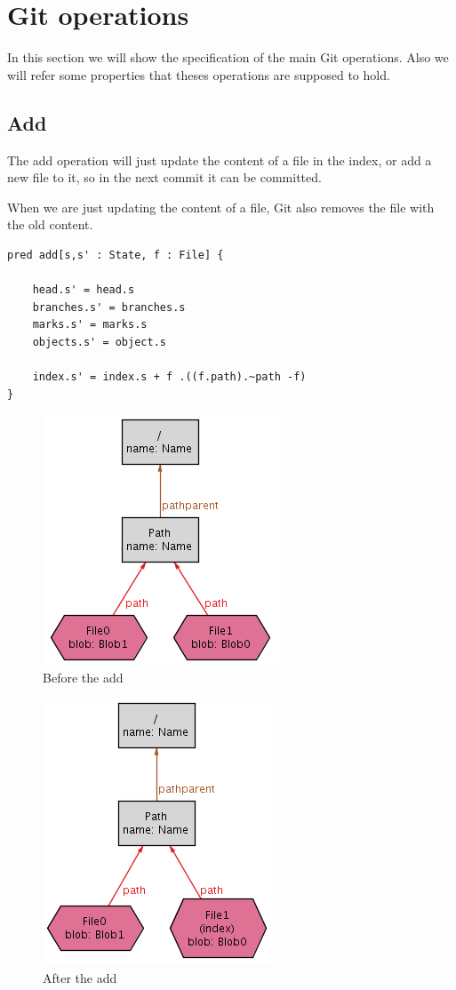 \section{Git operations}

In this section we will show the specification of the main Git operations.
Also we will refer some properties 
that theses operations are supposed to hold. \par

\subsection{Add}

The add operation will just update the content of a file in the index, 
or add a new file to it, so in the next commit it can be committed. \par
When we are just updating the content of a file, Git also removes the file
with the old content.

\begin{lstlisting}
pred add[s,s' : State, f : File] {
	
	head.s' = head.s
	branches.s' = branches.s
	marks.s' = marks.s
	objects.s' = object.s

	index.s' = index.s + f .((f.path).~path -f)
}
\end{lstlisting}

\begin{figure}[h!] 
	\caption{Before the add}
	\centering
	\includegraphics[scale=0.65]{images/add1.png}
\end{figure}

\begin{figure}[h!] 
	\caption{After the add}
	\centering
	\includegraphics[scale=0.65]{images/add2.png}
\end{figure}

